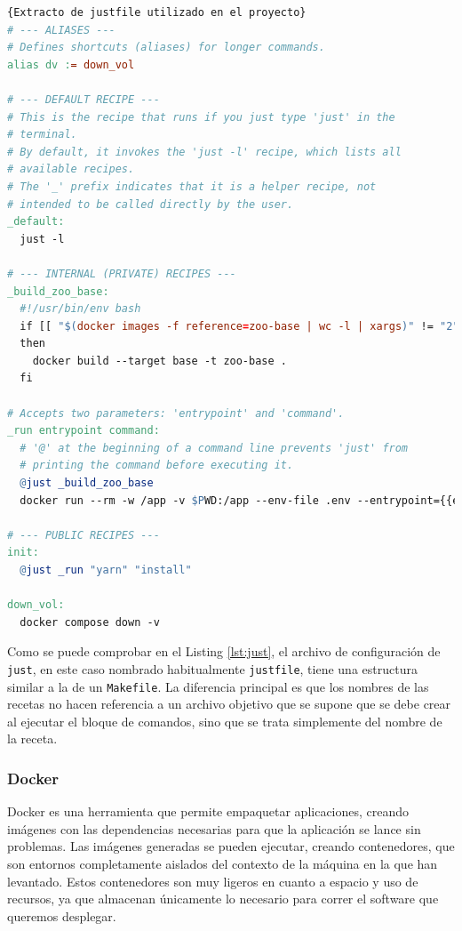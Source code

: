 \begin{lstlisting}[language=make,label=lst:just]{Extracto de justfile utilizado en el proyecto}
# --- ALIASES ---
# Defines shortcuts (aliases) for longer commands.
alias dv := down_vol

# --- DEFAULT RECIPE ---
# This is the recipe that runs if you just type 'just' in the
# terminal.
# By default, it invokes the 'just -l' recipe, which lists all
# available recipes.
# The '_' prefix indicates that it is a helper recipe, not
# intended to be called directly by the user.
_default:
  just -l

# --- INTERNAL (PRIVATE) RECIPES ---
_build_zoo_base:
  #!/usr/bin/env bash
  if [[ "$(docker images -f reference=zoo-base | wc -l | xargs)" != "2" ]]
  then
    docker build --target base -t zoo-base .
  fi

# Accepts two parameters: 'entrypoint' and 'command'.
_run entrypoint command:
  # '@' at the beginning of a command line prevents 'just' from
  # printing the command before executing it.
  @just _build_zoo_base
  docker run --rm -w /app -v $PWD:/app --env-file .env --entrypoint={{entrypoint}} zoo-base {{command}}

# --- PUBLIC RECIPES ---
init:
  @just _run "yarn" "install"

down_vol:
  docker compose down -v
\end{lstlisting}

Como se puede comprobar en el Listing \ref{lst:just}, el archivo de configuración de \texttt{just}, en este caso nombrado habitualmente \texttt{justfile}, tiene una estructura similar a la de un \texttt{Makefile}. La diferencia principal es que los nombres de las recetas no hacen referencia a un archivo objetivo que se supone que se debe crear al ejecutar el bloque de comandos, sino que se trata simplemente del nombre de la receta.

\subsubsection*{Docker}

Docker\cite{docker} es una herramienta que permite empaquetar aplicaciones, creando imágenes con las dependencias necesarias  para que la aplicación se lance sin problemas. Las imágenes generadas se pueden ejecutar, creando contenedores, que son entornos completamente aislados del contexto de la máquina en la que han levantado. Estos contenedores son muy ligeros en cuanto a espacio y uso de recursos, ya que almacenan únicamente lo necesario para correr el software que queremos desplegar.


